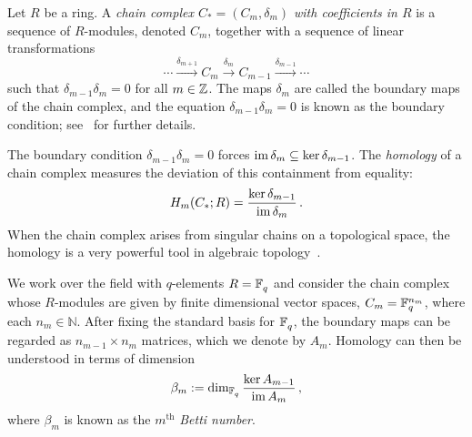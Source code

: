 Let $R$ be a ring. A {\em chain complex $C_*=(C_m, \delta_m)$ with coefficients in
$R$} is a sequence of $R$-modules, denoted $C_m$, together with a sequence of
linear transformations 
\[
  \cdots \xrightarrow{\delta_{m+1}} C_m \xrightarrow{\delta_m}
  C_{m-1} \xrightarrow{\delta_{m-1}} \cdots
\]
such that $\delta_{m-1}\delta_m = 0$ for all $m \in \mathbb{Z}$.  The maps $\delta_m$
are called the boundary maps of the chain complex, and the equation
$\delta_{m-1} \delta_m = 0$ is known as the boundary condition;
see~\cite{cartan2016homological} for further details. 

The boundary condition $\delta_{m-1}\delta_m=0$ forces $\operatorname{\mathrm{im}} \delta_m \subseteq \ker \delta_{m-1}$.
The {\em homology} of a chain complex measures the deviation of this containment
from equality:
\begin{equation*}
  \label{eqn:hom}
  H_m(C_*;R) = \frac{\ker \delta_{m-1}}{\operatorname{\mathrm{im}} \delta_m} \, .
\end{equation*}
When the chain complex arises from singular chains on a topological
space, the homology is a very powerful tool in algebraic topology~\cite{hatcher2002algebraic}.   

We work over the field with $q$-elements $R = \mathbb{F}_q^{}$ and consider the chain
complex whose $R$-modules are given by finite dimensional vector spaces,  $C_m
= \mathbb{F}_q^{n_m}$, where each $n_m \in \mathbb{N}$. After fixing the standard
basis for $\mathbb{F}_q^{}$, the boundary
maps can be regarded as $n_{m-1}\times n_m $ matrices, which we denote by
$A_m$. Homology can then be understood in terms of dimension
\begin{equation*}
  \beta_m := \dim_{\mathbb{F}_q^{}} \frac{\ker A_{m-1}}{\operatorname{\mathrm{im}} A_m} \, ,
  \label{eqn:betti_numbers}
\end{equation*}
where $\beta_m$ is known as the $m^\mathrm{th}$ {\em Betti number}.

%

